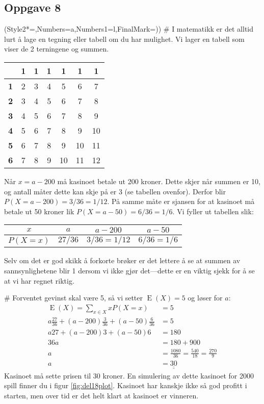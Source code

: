 \documentclass[12pt, a4paper]
{article}						%
\def\answer#1{\underline{\underline{#1}}}
\begin{document}
\subsection*{Oppgave 8}
\begin{easylist}[enumerate]
	\ListProperties(Style2*=,Numbers=a,Numbers1=l,FinalMark={)})
	# I matematikk er det alltid lurt å lage en tegning eller tabell om du har mulighet.
	Vi lager en tabell som viser de 2 terningene og summen.
	\begin{center}
		\begin{tabular}{c|cccccc}
			& \textbf{1} & \textbf{1} & \textbf{1} & \textbf{1} & \textbf{1} & \textbf{1}  \\ \hline
		  \textbf{1} & 2 & 3 & 4 & 5 & 6 & 7  \\
		  \textbf{2} & 3 & 4 & 5 & 6 & 7 & 8  \\
		  \textbf{3} & 4 & 5 & 6 & 7 & 8 & 9  \\
		  \textbf{4} & 5 & 6 & 7 & 8 & 9 & 10  \\
		  \textbf{5} & 6 & 7 & 8 & 9 & 10 & 11  \\
		  \textbf{6} & 7 & 8 & 9 & 10 & 11 & 12  
		\end{tabular}
	\end{center}
	Når $x = a-200$ må kasinoet betale ut 200 kroner. Dette skjer når summen er 10, og antall måter dette kan skje på er 3 (se tabellen ovenfor). Derfor blir $P(X = a - 200) = 3 / 36 = 1/12$.
	På samme måte er sjansen for at kasinoet må betale ut 50 kroner lik $P(X = a - 50) = 6 / 36 = 1/6$.
	Vi fyller ut tabellen slik:
\begin{center}
	\begin{tabular}{|c|c|c|c|}
		\hline
		$x$ & $a$ & $a-200$ & $a-50$ \\ \hline
		$P(X = x)$ & $27 / 36$ & \answer{$3/36 = 1/12$} & \answer{$6/36 = 1/6$} \\ \hline
	\end{tabular}
\end{center}
	Selv om det er god skikk å forkorte brøker er det lettere å se at summen av sannsynlighetene blir 1 dersom vi ikke gjør det---dette er en viktig sjekk for å se at vi har regnet riktig.
	
	# Forventet gevinst skal være 5, så vi setter $\operatorname{E}(X) = 5$ og løser for $a$:
	\begin{align*}
		\operatorname{E}(X) = \sum_{x \in X} x P(X = x) &= 5 \\
		 a\frac{27}{36} + (a-200)\frac{3}{36}+ (a-50)\frac{6}{36} &= 5 \\
		a27 + (a-200)3 + (a-50)6 &= 180 \\
		36a &= 180 + 900 \\
		a &= \frac{1080}{36} = \frac{540}{18} = \frac{270}{9} \\
		a &= \answer{30} 
	\end{align*}
	Kasinoet må sette prisen til 30 kroner. En simulering av dette kasinoet for 2000 spill finner du i figur \ref{fig:del18plot}. Kasinoet har kanskje ikke så god profitt i starten, men over tid er det helt klart at kasinoet er vinneren.
	

\end{easylist}
\end{document}
